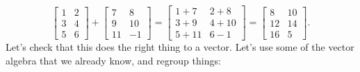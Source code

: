 \documentclass{ximera}
\begin{document}
\begin{equation*}
    \begin{bmatrix}
        1 & 2 \\
        3 & 4 \\
        5 & 6
    \end{bmatrix}
    +
    \begin{bmatrix}
        7 & 8 \\
        9 & 10 \\
        11 & -1
    \end{bmatrix}
    =
    \begin{bmatrix}
        1+7 & 2+8 \\
        3+9 & 4+10 \\
        5+11 & 6-1
    \end{bmatrix}
    =
    \begin{bmatrix}
        8 & 10 \\
        12 & 14 \\
        16 & 5
    \end{bmatrix} .
\end{equation*}
Let's check that this does the right thing to a vector.  Let's use some of the vector algebra that we already know, and regroup things:
\end{document}
